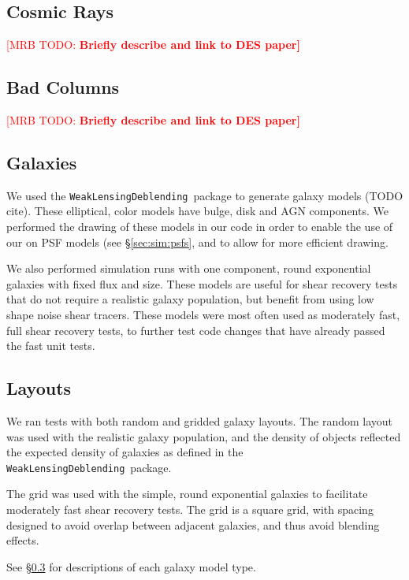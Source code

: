 \documentclass[iop, twocolappendix, appendixfloats, numberedappendix, apj]{hackemulateapj}
\newcommand{\mattodo}[1]{\textcolor{red}{[MRB TODO: \bf #1]}}
\newcommand{\descwl}{\texttt{WeakLensingDeblending}}
\begin{document}
\subsection{Cosmic Rays} \label{sec:sim:cosmics}

\mattodo{Briefly describe and link to DES paper}

\subsection{Bad Columns} \label{sec:sim:badcols}

\mattodo{Briefly describe and link to DES paper}

\subsection{Galaxies} \label{sec:sim:galaxies}

We used the \descwl\ package to generate galaxy models (TODO cite).  These
elliptical, color models have bulge, disk and AGN components. We performed the
drawing of these models in our code in order to enable the use of our on PSF
models (see \S \ref{sec:sim:psfs}, and to allow for more efficient drawing.

We also performed simulation runs with one component, round exponential
galaxies with fixed flux and size.  These models are useful for shear recovery
tests that do not require a realistic galaxy population, but benefit from using
low shape noise shear tracers.  These models were most often used as moderately
fast, full shear recovery tests, to further test code changes
that have already passed the fast unit tests.

\subsection{Layouts} \label{sec:sim:layouts}

We ran tests with both random and gridded galaxy layouts.  The random layout
was used with the realistic galaxy population, and the density of objects
reflected the expected density of galaxies as defined in the \descwl\ package.

The grid was used with the simple, round exponential galaxies to facilitate
moderately fast shear recovery tests.  The grid is a square grid, with spacing
designed to avoid overlap between adjacent galaxies, and thus avoid blending
effects.

See \S \ref{sec:sim:galaxies} for descriptions of each galaxy model type.
\end{document}
